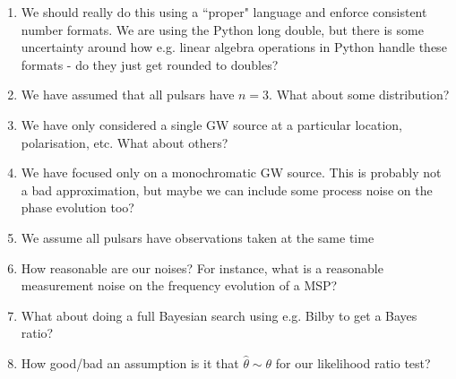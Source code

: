 \documentclass{tufte-handout} %
\begin{document}
 \begin{enumerate}
 	
 	\item We should really do this using a ``proper" language and enforce consistent number formats. We are using the Python long double, but there is some uncertainty around how e.g. linear algebra operations in Python handle these formats - do they just get rounded to doubles?  
 	
 	\item We have assumed that all pulsars have $n=3$. What about some distribution?
 	
 	\item We have only considered a single GW source at a particular location, polarisation, etc. What about others?
 	
 	\item We have focused only on a monochromatic GW source. This is probably not a bad approximation, but maybe we can include some process noise on the phase evolution too?
 	
 	 \item We assume all pulsars have observations taken at the same time
 	
 	\item How reasonable are our noises? For instance, what is a reasonable measurement noise on the frequency evolution of a MSP?
 	
 	 \item What about doing a full Bayesian search using e.g. Bilby to get a Bayes ratio?
 	
 	 \item How good/bad an assumption is it that $\hat{\theta} \sim \theta$ for our likelihood ratio test?
 \end{enumerate}
 
\end{document}

